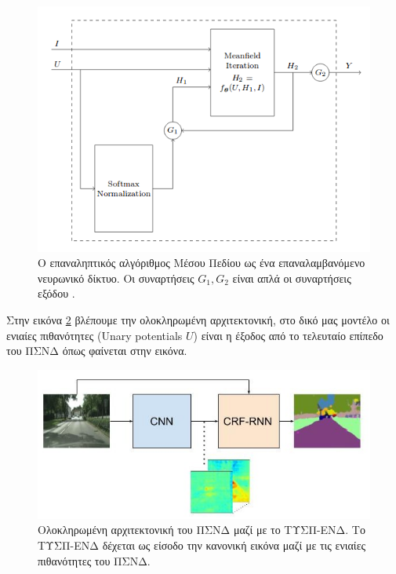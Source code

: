 \begin{figure}[H]
 \centering
 \includegraphics[scale=0.6]{Images/crf_as_rnn}
 \caption[CRF-RNN Network]{\textgreek{Ο επαναληπτικός αλγόριθμος Μέσου Πεδίου ως ένα επαναλαμβανόμενο νευρωνικό δίκτυο. Οι συναρτήσεις} $G_{1}, G_{2}$ \textgreek{είναι απλά οι συναρτήσεις εξόδου} \cite{crf_as_rnn}.}
  \label{fig:crf_rnn}
\end{figure}

\textgreek{Στην εικόνα} \ref{fig:crf-rnn-complete} \textgreek{βλέπουμε την ολοκληρωμένη αρχιτεκτονική, στο δικό μας μοντέλο οι ενιαίες πιθανότητες }(Unary potentials $\mathit U$) \textgreek{είναι η έξοδος από το τελευταίο επίπεδο του ΠΣΝΔ όπως φαίνεται στην εικόνα.}

\begin{figure}[H]
 \centering
 \includegraphics[scale=0.6]{Images/crf-rnn-mine}
 \caption[CNN CRF-RNN Network]{\textgreek{Ολοκληρωμένη αρχιτεκτονική του ΠΣΝΔ μαζί με το ΤΥΣΠ-ΕΝΔ. Το ΤΥΣΠ-ΕΝΔ δέχεται ως είσοδο την κανονική εικόνα μαζί με τις ενιαίες πιθανότητες του ΠΣΝΔ.}}
 \label{fig:crf-rnn-complete}
\end{figure}
